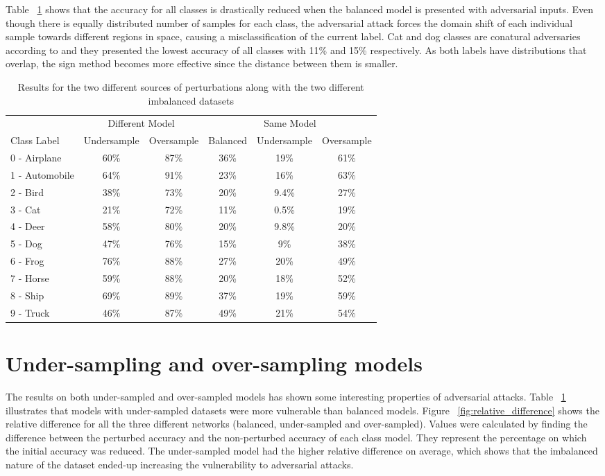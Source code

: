 Table ~\ref{tbl:results} shows that the accuracy for all classes is drastically reduced when the balanced model is presented with adversarial inputs. Even though there is equally distributed number of samples for each class, the adversarial attack forces the domain shift of each individual sample towards different regions in space, causing a misclassification of the current label. Cat and dog classes are conatural adversaries according to \cite{papernot2016} and they presented the lowest accuracy of all classes with 11\% and 15\% respectively. As both labels have distributions that overlap, the sign method becomes more effective since the distance between them is smaller. 
\begin{table}
	\centering
	
	\begin{tabular}{lccccc}
		\toprule
		&\multicolumn{2}{c}{Different Model}
		&\multicolumn{3}{c}{Same Model}
		\\\cmidrule(r){2-3}\cmidrule(l){4-6}
		Class Label &Undersample &Oversample &Balanced &Undersample &Oversample \\
		\midrule
		0 - Airplane &60\%& 87\% &36\%& 19\%    & 61\% \\
		1 - Automobile &64\%& 91\% &23\%& 16\%    & 63\% \\
		2 - Bird &38\%& 73\% &20\%& 9.4\%    & 27\% \\
		3 - Cat &21\%& 72\% &11\%& 0.5\%    & 19\% \\
		4 - Deer &58\%& 80\% &20\%& 9.8\%    & 20\% \\
		5 - Dog &47\%& 76\% &15\%& 9\%    & 38\% \\
		6 - Frog &76\%& 88\% &27\%& 20\%    & 49\% \\
		7 - Horse &59\%& 88\% &20\%& 18\%    & 52\% \\
		8 - Ship &69\%& 89\% &37\%& 19\%    & 59\% \\
		9 - Truck &46\%& 87\% &49\%& 21\%    & 54\% \\
		\bottomrule
	\end{tabular}
	\caption{Results for the two different sources of perturbations along with the two different imbalanced datasets}
	\label{tbl:results}
\end{table}
\section{Under-sampling and over-sampling models}

The results on both under-sampled and over-sampled models has shown some interesting properties of adversarial attacks. 
Table ~\ref{tbl:results} illustrates that models with under-sampled datasets were more vulnerable than balanced models. Figure ~\ref{fig:relative_difference} shows the relative difference for all the three different networks (balanced, under-sampled and over-sampled). Values were calculated by finding the difference between the perturbed accuracy and the non-perturbed accuracy of each class model. They represent the percentage on which the initial accuracy was reduced. The under-sampled model had the higher relative difference on average, which shows that the imbalanced nature of the dataset ended-up increasing the vulnerability to adversarial attacks.


